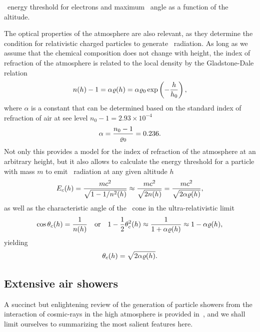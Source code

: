 \begin{marginfigure}
  
  \caption{\cherenkov~energy threshold for electrons and maximum \cherenkov~angle
  as a function of the altitude.}
  \label{fig:atmospheric_cherenkov}
\end{marginfigure}

The optical properties of the atmosphere are also relevant, as they determine the
condition for relativistic charged particles to generate \cherenkov~radiation.
As long as we assume that the chemical composition does not change with height,
the index of refraction of the atmosphere is related to the local density by the
Gladstone-Dale relation
\begin{align}
  n(h) - 1 = \alpha \varrho(h) = \alpha \varrho_0 \exp\left(-\frac{h}{h_0}\right),
\end{align}
where $\alpha$ is a constant that can be determined based on the standard index
of refraction of air at see level $n_0 - 1 = 2.93 \times 10^{-4}$
\begin{align*}
  \alpha = \frac{n_0 - 1}{\varrho_0} = 0.236.
\end{align*}
Not only this provides a model for the index of refraction of the atmosphere at
an arbitrary height, but it also allows to calculate the energy threshold
for a particle with mass $m$ to emit \cherenkov~radiation at any given altitude $h$
\begin{align}
  E_c(h) = \frac{mc^2}{\sqrt{1 - 1 / n^2(h)}} \approx \frac{mc^2}{\sqrt{2 n(h)}} =
  \frac{mc^2}{\sqrt{2 \alpha \varrho(h)}},
\end{align}
as well as the characteristic angle of the \cherenkov~cone in the ultra-relativistic
limit
\begin{align*}
  \cos\theta_c(h) = \frac{1}{n(h)}
  \quad\text{or}\quad
  1 - \frac{1}{2} \theta_c^2(h) \approx \frac{1}{1 + \alpha \varrho(h)}
  \approx 1 - \alpha \varrho(h),
\end{align*}
yielding
\begin{align}
  \theta_c(h) = \sqrt{2 \alpha \varrho(h)}.
\end{align}


\subsection{Extensive air showers}

A succinct but enlightening review of the generation of particle showers from the
interaction of cosmic-rays in the high atmosphere is provided in~\cite{2018PrPNP..98...85M},
and we shall limit ourselves to summarizing the most salient features here.

